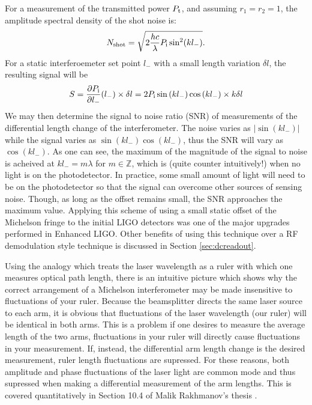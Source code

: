 For a measurement of the transmitted power $P_{\rm t}$, and assuming $r_1=r_2=1$, the amplitude spectral density of the shot noise is:
\begin{equation}
\label{eqn:michshotnoise}
N_{\rm{shot}}=\sqrt{2\frac{hc}{\lambda}P_{\rm i}\sin^2(kl_-)}.
\end{equation}
For a static interferoemeter set point $l_-$ with a small length variation $\delta l$, the resulting signal will be
\begin{equation}
S=\frac{\partial P_{\rm i}}{\partial l_-}(l_-) \times \delta l = 2P_{\rm i}\sin{(kl_-)}\cos{(kl_-)}\times k\delta l
\end{equation}
We may then determine the signal to noise ratio (SNR) of measurements of the differential length change of the interferometer. %
The noise varies as $|\sin(kl_-)|$ while the signal varies as $\sin(kl_-)\cos(kl_-)$, thus the SNR will vary as $\cos(kl_-)$. %
As one can see, the maximum of the magnitude of the signal to noise is acheived at $kl_- = m \lambda$ for $m \in \mathbb{Z}$, which is (quite counter intuitively!) when no light is on the photodetector. %
In practice, some small amount of light will need to be on the photodetector so that the signal can overcome other sources of sensing noise. %
Though, as long as the offset remains small, the SNR approaches the maximum value. %
Applying this scheme of using a small static offset of the Michelson fringe to the initial LIGO detectors was one of the major upgrades performed in Enhanced LIGO. %
Other benefits of using this technique over a RF demodulation style technique is discussed in Section \ref{sec:dcreadout}.

Using the analogy which treats the laser wavelength as a ruler with which one measures optical path length, there is an intuitive picture which shows why the correct arrangement of a Michelson interferometer may be made insensitive to fluctuations of your ruler. %
Because the beamsplitter directs the same laser source to each arm, it is obvious that fluctuations of the laser wavelength (our ruler) will be identical in both arms. %
This is a problem if one desires to measure the average length of the two arms, fluctuations in your ruler will directly cause fluctuations in your measurement. %
If, instead, the differential arm length change is the desired measurement, ruler length fluctuations are supressed. %
For these reasons, both amplitude and phase fluctuations of the laser light are common mode and thus supressed when making a differential measurement of the arm lengths. %
This is covered quantitatively in Section 10.4 of Malik Rakhmanov's thesis \cite{Rakhmanov}.

